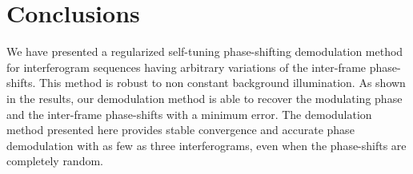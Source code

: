 \documentclass[letterpaper,12pt]{article}   %
\begin{document}
\section{Conclusions}
We have presented a regularized self-tuning phase-shifting demodulation method for interferogram sequences having arbitrary variations of the inter-frame phase-shifts. This method is robust to non constant background illumination. As shown in the results, our demodulation method is able to recover the modulating phase and the inter-frame phase-shifts with a minimum error. The demodulation method presented here provides stable convergence and accurate phase demodulation with as few as three interferograms, even when the phase-shifts are completely random.



\end{document}
